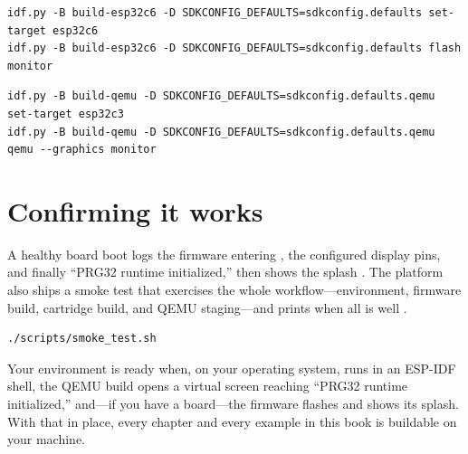 \begin{lstlisting}[style=bash,caption={Building and flashing for the physical ESP32\nobreakdash-C6 board.}]
idf.py -B build-esp32c6 -D SDKCONFIG_DEFAULTS=sdkconfig.defaults set-target esp32c6
idf.py -B build-esp32c6 -D SDKCONFIG_DEFAULTS=sdkconfig.defaults flash monitor
\end{lstlisting}

\begin{lstlisting}[style=bash,caption={Building and running for the QEMU emulator (ESP32\nobreakdash-C3 target).}]
idf.py -B build-qemu -D SDKCONFIG_DEFAULTS=sdkconfig.defaults.qemu set-target esp32c3
idf.py -B build-qemu -D SDKCONFIG_DEFAULTS=sdkconfig.defaults.qemu qemu --graphics monitor
\end{lstlisting}

\section{Confirming it works}

A healthy board boot logs the firmware entering , the configured
display pins, and finally ``PRG32 runtime initialized,'' then shows the splash
\citep{prg32tutorial}. The platform also ships a smoke test that exercises the whole
workflow---environment, firmware build, cartridge build, and QEMU staging---and
prints  when all is well \citep{prg32repo}.

\begin{lstlisting}[style=bash,caption={Running the end-to-end smoke test.}]
./scripts/smoke_test.sh
\end{lstlisting}

\begin{prgcheck}
Your environment is ready when, on your operating system,  runs in an
ESP-IDF shell, the QEMU build opens a virtual screen reaching ``PRG32 runtime
initialized,'' and---if you have a board---the firmware flashes and shows its
splash. With that in place, every chapter and every example in this book is
buildable on your machine.
\end{prgcheck}
